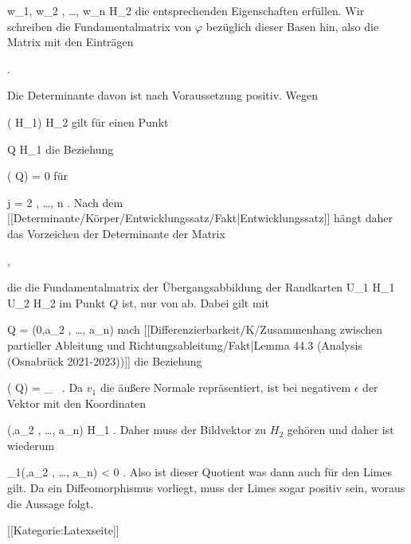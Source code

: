 {\mavergleichskette
{\vergleichskette
{ w_1, w_2 , \ldots , w_n
}
{ \in }{ H_2
}
{  }{
}
{    }{
}
{   }{
}
}
{}{}{}
die entsprechenden Eigenschaften erfüllen. Wir schreiben die Fundamentalmatrix von $\varphi$ bezüglich dieser Basen hin, also die Matrix mit den Einträgen

 { . }

Die Determinante davon ist nach Voraussetzung positiv. Wegen

\mavergleichskette
{\vergleichskette
{ \varphi ( \partial H_1)
}
{ \subseteq }{ \partial H_2
}
{  }{
}
{    }{
}
{   }{
}
}
{}{}{}
gilt für einen Punkt

\mavergleichskette
{\vergleichskette
{ Q
}
{ \in }{ \partial H_1
}
{  }{
}
{    }{
}
{   }{
}
}
{}{}{}
die Beziehung

\mavergleichskettedisp
{\vergleichskette
{ {  } ( Q)
}
{ =} { 0
}
{ } {
}
{ } {
}
{ } {
}
}
{}{}{}
für

\mavergleichskette
{\vergleichskette
{ j
}
{ = }{ 2 , \ldots , n
}
{  }{
}
{    }{
}
{   }{
}
}
{}{}{.}
Nach
dem [[Determinante/Körper/Entwicklungssatz/Fakt|Entwicklungssatz]]
hängt daher das Vorzeichen der Determinante der Matrix

 { , }

die die Fundamentalmatrix der Übergangsabbildung der Randkarten
\maabbdisp {} {U_1 \cap \partial H_1 } { U_2 \cap \partial H_2
} {}
 {} {}
im Punkt $Q$ ist, nur von
 ab. Dabei gilt mit

\mavergleichskette
{\vergleichskette
{ Q
}
{ = }{ (0,a_2 , \ldots , a_n)
}
{  }{
}
{    }{
}
{   }{
}
}
{}{}{}
nach
[[Differenzierbarkeit/K/Zusammenhang zwischen partieller Ableitung und Richtungsableitung/Fakt|Lemma 44.3 (Analysis (Osnabrück 2021-2023))]]
die Beziehung

\mavergleichskettedisp
{\vergleichskette
{ {  } ( Q)
}
{ =} { _{   \epsilon {}   } \,  {  }
}
{ } {
}
{ } {
}
{ } {
}
}
{}{}{.}
Da $v_1$ die äußere Normale repräsentiert, ist bei negativem
 {} {}
$\epsilon$ der Vektor mit den Koordinaten

\mavergleichskette
{\vergleichskette
{ (\epsilon,a_2 , \ldots , a_n)
}
{ \in }{ H_1
}
{  }{
}
{    }{
}
{   }{
}
}
{}{}{.}
Daher muss der Bildvektor zu $H_2$ gehören und daher ist wiederum

\mavergleichskette
{\vergleichskette
{ \varphi_1(\epsilon,a_2 , \ldots , a_n)
}
{ < }{ 0
}
{  }{
}
{    }{
}
{   }{
}
}
{}{}{.}
Also ist dieser Quotient
 was dann auch für den Limes gilt. Da ein Diffeomorphismus vorliegt, muss der Limes sogar positiv sein, woraus die Aussage folgt.

}

 [[Kategorie:Latexseite]]
